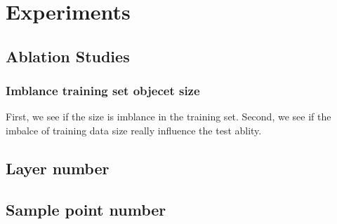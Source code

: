 \documentclass[11pt,a4paper]{article}
\begin{document}
\section{Experiments}
\subsection{Ablation Studies}
\subsubsection{Imblance training set objecet size}
First, we see if the size is imblance in the training set.
Second, we see if the imbalce of training data size really influence the test ablity.
\subsection{Layer number}
\subsection{Sample point number}
\newpage


\end{document}
